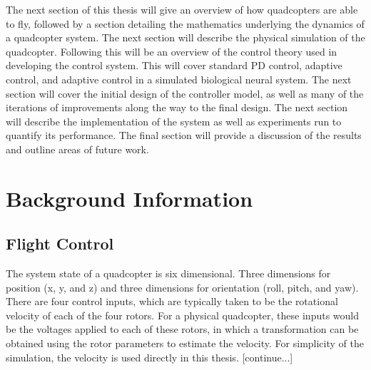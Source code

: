 \documentclass[letterpaper,12pt,titlepage,oneside,final]{book}
\begin{document}
The next section of this thesis will give an overview of how quadcopters are able to fly, followed by a section detailing the mathematics underlying the dynamics of a quadcopter system. 
The next section will describe the physical simulation of the quadcopter. 
Following this will be an overview of the control theory used in developing the control system. 
This will cover standard PD control, adaptive control, and adaptive control in a simulated biological neural system. 
The next section will cover the initial design of the controller model, as well as many of the iterations of improvements along the way to the final design. 
The next section will describe the implementation of the system as well as experiments run to quantify its performance. 
The final section will provide a discussion of the results and outline areas of future work.

\chapter{Background Information}

\section{Flight Control}


The system state of a quadcopter is six dimensional. 
Three dimensions for position (x, y, and z) and three dimensions for orientation (roll, pitch, and yaw). 
There are four control inputs, which are typically taken to be the rotational velocity of each of the four rotors. 
For a physical quadcopter, these inputs would be the voltages applied to each of these rotors, in which a transformation can be obtained using the rotor parameters to estimate the velocity. 
For simplicity of the simulation, the velocity is used directly in this thesis. [continue...]
\end{document}
